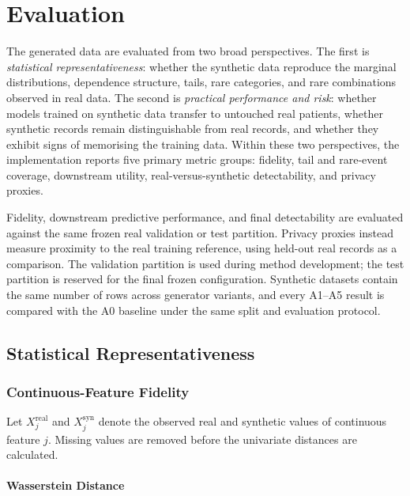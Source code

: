 \chapter{Evaluation}
\label{chap:evaluation}

The generated data are evaluated from two broad perspectives. The first is
\emph{statistical representativeness}: whether the synthetic data reproduce
the marginal distributions, dependence structure, tails, rare categories, and
rare combinations observed in real data. The second is \emph{practical
performance and risk}: whether models trained on synthetic data transfer to
untouched real patients, whether synthetic records remain distinguishable from
real records, and whether they exhibit signs of memorising the training data.
Within these two perspectives, the implementation reports five primary metric
groups: fidelity, tail and rare-event coverage, downstream utility,
real-versus-synthetic detectability, and privacy proxies.

Fidelity, downstream predictive performance, and final detectability are
evaluated against the same frozen real validation or test partition. Privacy
proxies instead measure proximity to the real training reference, using
held-out real records as a comparison. The validation partition is used during method
development; the test partition is reserved for the final frozen
configuration. Synthetic datasets contain the same number of rows across
generator variants, and every A1--A5 result is compared with the A0 baseline
under the same split and evaluation protocol.

\section{Statistical Representativeness}
\label{sec:statistical_representativeness}

\subsection{Continuous-Feature Fidelity}
\label{subsec:continuous_fidelity}

Let $X_j^{\mathrm{real}}$ and $X_j^{\mathrm{syn}}$ denote the observed real and
synthetic values of continuous feature $j$. Missing values are removed before
the univariate distances are calculated.

\subsubsection{Wasserstein Distance}

